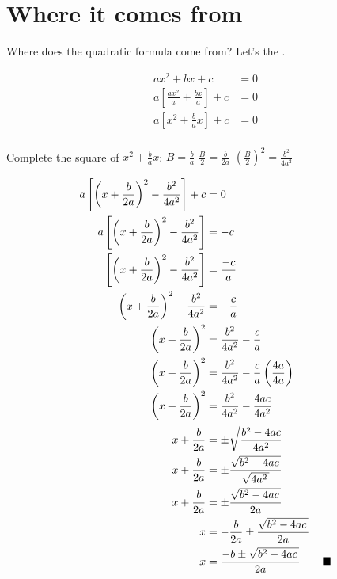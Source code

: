\section{Where it comes from}

Where does the quadratic formula come from?
Let's  the .


\begin{tcolorbox}[width=0.65\textwidth,colback=white,colframe=white,]
    \large
    \addtolength\jot{0.5em} %
    \begin{align*}
        a x^2 + bx + c &= 0 \\
        a \left[ \frac{ax^2}{a} + \frac{bx}{a} \right]  +  c &= 0 \\
        a \left[ x^2 + \frac{b}{a}x \right]  +  c &= 0 \\
    \end{align*}
\end{tcolorbox}

Complete the square of {$x^2 + \frac{b}{a}x$}:
\hspace{0.5in}
{
\large
$B = \frac{b}{a}$
\qquad
$\frac{B}{2} = \frac{b}{2a}$ 
\qquad
$\left(\frac{B}{2}\right)^2 = \frac{b^2}{4a^2}$
}
\begin{tcolorbox}[width=0.65\textwidth,colback=white,colframe=white,]
    \large
    \addtolength\jot{0.5em} %
    \begin{align*}
        a \left[ \left( x + \frac{b}{2a} \right)^2 - \frac{b^2}{4a^2}  \right]  +  c &= 0 \\
        a \left[ \left( x + \frac{b}{2a} \right)^2 - \frac{b^2}{4a^2}  \right]   &= -c \\
        \left[ \left( x + \frac{b}{2a} \right)^2 - \frac{b^2}{4a^2}  \right]   &= \frac{-c}{a} \\
        \left( x + \frac{b}{2a} \right)^2 - \frac{b^2}{4a^2}   &= - \frac{c}{a} \\
        \left( x + \frac{b}{2a} \right)^2 &= \frac{b^2}{4a^2} - \frac{c}{a} \\
        \left( x + \frac{b}{2a} \right)^2 &= \frac{b^2}{4a^2} - \frac{c}{a} \left( \frac{4a}{4a}\right) \\
        \left( x + \frac{b}{2a} \right)^2 &= \frac{b^2}{4a^2} - \frac{4ac}{4a^2} \\
        x + \frac{b}{2a}  &= \pm \myRoot{  \frac{b^2-4ac}{4a^2}  }  \\
        x + \frac{b}{2a}  &= \pm {  \frac{\myRoot{b^2-4ac}}{\myRoot{4a^2}}  }  \\
        x + \frac{b}{2a}  &= \pm {  \frac{\myRoot{b^2-4ac}}{2a}  }  \\
        x &= - \frac{b}{2a} \pm {  \frac{\myRoot{b^2-4ac}}{2a}  }  \\
        x &= \frac{-b \pm \myRoot{b^2-4ac}}{2a}\qquad\blacksquare  \\
    \end{align*}
\end{tcolorbox}
